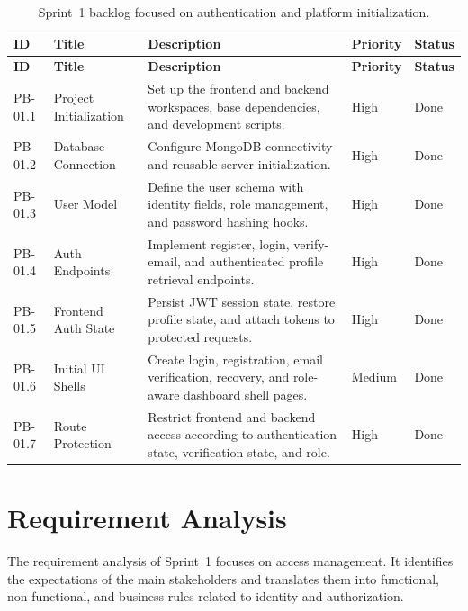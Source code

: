 \documentclass[a4paper,12pt]{report}
\begin{document}
\begin{longtable}{@{} L{0.10\textwidth} L{0.18\textwidth} L{0.42\textwidth} C{0.10\textwidth} C{0.11\textwidth} @{}}
\caption{Sprint~1 backlog focused on authentication and platform initialization.}
\label{tab:sprint1-backlog}\\
\toprule
\textbf{ID} &
\textbf{Title} &
\textbf{Description} &
\textbf{Priority} &
\textbf{Status} \\
\midrule
\endfirsthead

\toprule
\textbf{ID} &
\textbf{Title} &
\textbf{Description} &
\textbf{Priority} &
\textbf{Status} \\
\midrule
\endhead

PB-01.1 & Project Initialization & Set up the frontend and backend workspaces, base dependencies, and development scripts. & High & Done \\
\midrule
PB-01.2 & Database Connection & Configure MongoDB connectivity and reusable server initialization. & High & Done \\
\midrule
PB-01.3 & User Model & Define the user schema with identity fields, role management, and password hashing hooks. & High & Done \\
\midrule
PB-01.4 & Auth Endpoints & Implement register, login, verify-email, and authenticated profile retrieval endpoints. & High & Done \\
\midrule
PB-01.5 & Frontend Auth State & Persist JWT session state, restore profile state, and attach tokens to protected requests. & High & Done \\
\midrule
PB-01.6 & Initial UI Shells & Create login, registration, email verification, recovery, and role-aware dashboard shell pages. & Medium & Done \\
\midrule
PB-01.7 & Route Protection & Restrict frontend and backend access according to authentication state, verification state, and role. & High & Done \\

\bottomrule
\end{longtable}

\section{Requirement Analysis}
\label{sec:sprint1-analysis}

The requirement analysis of Sprint~1 focuses on access management. It identifies the expectations of the main stakeholders and translates them into functional, non-functional, and business rules related to identity and authorization.
\end{document}
